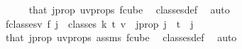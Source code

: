 \begin{isabellebody}
\ \ \ \ \isamarkupfalse%
\ that\ j{\isacharunderscore}{\kern0pt}prop\ uv{\isacharunderscore}{\kern0pt}props\ f{\isacharunderscore}{\kern0pt}cube\ \isamarkupfalse%
\ classes{\isacharunderscore}{\kern0pt}def\ \isamarkupfalse%
\ auto\isanewline
\ \ \isamarkupfalse%
\ f{\isacharunderscore}{\kern0pt}classes{\isacharunderscore}{\kern0pt}v{\isacharcolon}{\kern0pt}\ {\isachardoublequoteopen}{\isacharquery}{\kern0pt}f\ j\ {\isasymin}\ classes\ k\ t\ v{\isachardoublequoteclose}\ \ j{\isacharunderscore}{\kern0pt}prop{\isacharcolon}{\kern0pt}\ {\isachardoublequoteopen}j\ {\isacharequal}{\kern0pt}\ t{\isachardoublequoteclose}\ \ j\isanewline
\ \ \ \ \isamarkupfalse%
\ that\ j{\isacharunderscore}{\kern0pt}prop\ uv{\isacharunderscore}{\kern0pt}props\ assms{\isacharparenleft}{\kern0pt}{}{\isacharparenright}{\kern0pt}\ f{\isacharunderscore}{\kern0pt}cube\ \isamarkupfalse%
\ classes{\isacharunderscore}{\kern0pt}def\ \isamarkupfalse%
\ auto\isanewline
\isanewline
\ \ \isamarkupfalse%

\end{isabellebody}
